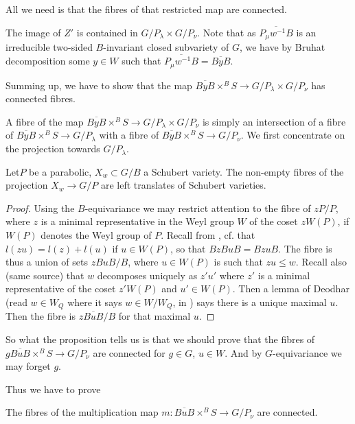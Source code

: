 All we need is that the fibres of that restricted map are connected.

The image of $Z'$ is contained in $G/P_{\lambda}\times
G/P_{\nu}$. Note that as $\overline{P_{\mu}w^{-1}B}$ is an irreducible
two-sided $B$-invariant closed subvariety of $G$, we have by Bruhat
decomposition some $y\in W$ such that
$\overline{P_{\mu}w^{-1}B}=\overline{ByB}$. 

Summing up, we have to show that the map $\overline{ByB}\times^{B}S\to
G/P_{\lambda}\times G/P_{\nu}$ has connected fibres.

A fibre of the map $\overline{ByB}\times^{B}S\to G/P_{\lambda}\times
G/P_{\nu}$ is simply an intersection of a fibre of
$\overline{ByB}\times^{B}S\to G/P_{\lambda}$ with a fibre of
$\overline{ByB}\times^{B}S\to G/P_{\nu}$. We first concentrate on the
projection towards $G/P_{\lambda}$.

\begin{proposition}\label{chap6-prop6.1.8}
Let\pageoriginale $P$\label{page61} be a parabolic, $X_{w}\subset G/B$ a Schubert
variety. The non-empty fibres of the projection $X_{w}\to G/P$ are
left translates of Schubert varieties.
\end{proposition}

\begin{proof}
Using the $B$-equivariance we may restrict attention to the fibre of
$zP/P$, where $z$ is a minimal representative in the Weyl group $W$ of
the coset $zW(P)$, if $W(P)$ denotes the Weyl group of $P$. Recall
from \cite[Proposition 1.10]{key10}, cf.\@ \cite[Ch.\@ IV, \S1
  Exercice 3]{key1} that $l(zu)=l(z)+l(u)$ if $u\in W(P)$, so that
$BzBuB=BzuB$. The fibre is thus a union of sets $zBuB/B$, where $u\in
W(P)$ is such that $zu\leq w$. Recall also (same source) that $w$
decomposes uniquely as $z'u'$ where $z'$ is a minimal representative
of the coset $z'W(P)$ and $u'\in W(P)$. Then a lemma of Deodhar (read
$w\in W_{Q}$ where it says $w\in W/W_{Q}$, in \cite[Lemma 4.4]{key16})
says there is a unique maximal $u$. Then the fibre is
$z\overline{BuB}/B$ for that maximal $u$.
\end{proof}

So what the proposition tells us is that we should prove that the
fibres of $g\overline{BuB}\times^{B}S\to G/P_{\nu}$ are connected for
$g\in G$, $u\in W$. And by $G$-equivariance we may forget $g$.

Thus we have to prove

\begin{proposition}\label{chap6-prop6.1.9}
The fibres of the multiplication map $m:\overline{BuB}\times^{B}S\to
G/P_{\nu}$ are connected.
\end{proposition}

